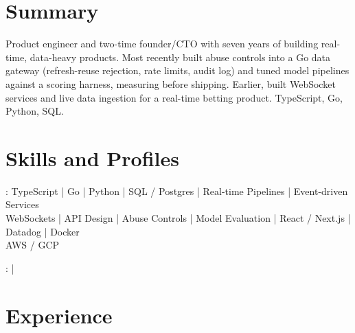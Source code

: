 \documentclass[print]{jack-resume}
\begin{document}
\pagecolor{darkmodeBackground}


\begin{minipage}[t][1cm][t]{.03\textwidth}
    \hfill
\end{minipage}

\section{Summary}
Product engineer and two-time founder/CTO with seven years of building real-time, data-heavy products. Most recently built abuse controls into a Go data gateway (refresh-reuse rejection, rate limits, audit log) and tuned model pipelines against a scoring harness, measuring before shipping. Earlier, built WebSocket services and live data ingestion for a real-time betting product. TypeScript, Go, Python, SQL.
\sectionsep

\section{Skills and Profiles}
:
TypeScript \hfill | \hfill
Go \hfill | \hfill
Python \hfill | \hfill
SQL / Postgres \hfill | \hfill
Real-time Pipelines \hfill | \hfill
Event-driven Services \\
\hspace{1.0cm} WebSockets \hfill | \hfill
API Design \hfill | \hfill
Abuse Controls \hfill | \hfill
Model Evaluation \hfill | \hfill
React / Next.js \hfill | \hfill
Datadog \hfill | \hfill
Docker \\
\hspace{1.0cm} AWS / GCP \\

\raggedright{
    :
      \href{https://www.linkedin.com/in/jack-sturtevant/}{ \ExternalLink} |
     \href{https://github.com/jacksturt}{ \ExternalLink}}

\section{Experience}
\end{document}
